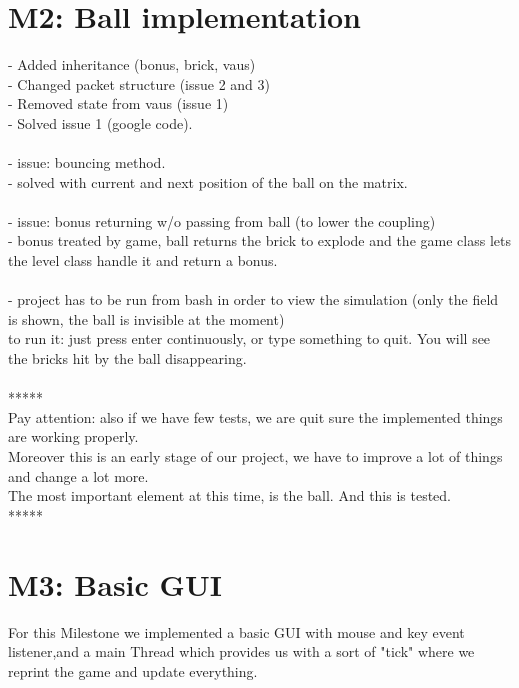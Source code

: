 \section*{M2: Ball implementation}
\label{sec:m2}
- Added inheritance (bonus, brick, vaus)\\
- Changed packet structure (issue 2 and 3)\\
- Removed state from vaus (issue 1)\\
- Solved issue 1 (google code).\\
\\
- issue: bouncing method.\\
	- solved with current and next position of the ball on the matrix.\\
\\
- issue: bonus returning w/o passing from ball (to lower the coupling)\\
	- bonus treated by game, ball returns the brick to explode and the game class lets the level class handle it and return a bonus.\\
\\
- project has to be run from bash in order to view the simulation (only the field is shown, the ball is invisible at the moment)\\
to run it: just press enter continuously, or type something to quit. You will see the bricks hit by the ball disappearing. \\
\\
*****\\
Pay attention: also if we have few tests, we are quit sure the implemented things are working properly.\\
Moreover this is an early stage of our project, we have to improve a lot of things and change a lot more.\\
The most important element at this time, is the ball. And this is tested.\\
*****\\

\section*{M3: Basic GUI}
\label{sec:m3}
For this Milestone we implemented a basic GUI with mouse and key event listener,and a main Thread which provides us with a sort of "tick" where we reprint the game and update everything.\\


